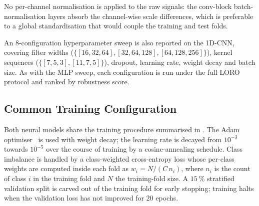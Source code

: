 \begin{table}[H]
\centering
\label{tab:cnn_arch}
\caption{1D-CNN architecture. \texttt{T} denotes the temporal length, which halves after each MaxPool stage; \texttt{C} is the number of output classes ($3$ on the farm, $5$ on the campus development dataset).}
\end{table}

No per-channel normalisation is applied to the raw signals: the conv-block batch-normalisation layers absorb the channel-wise scale differences, which is preferable to a global standardisation that would couple the training and test folds.

An $8$-configuration hyperparameter sweep is also reported on the 1D-CNN, covering filter widths ($\{[16,32,64],[32,64,128],[64,128,256]\}$), kernel sequences ($\{[7,5,3],[11,7,5]\}$), dropout, learning rate, weight decay and batch size. As with the MLP sweep, each configuration is run under the full LORO protocol and ranked by robustness score.

\subsection{Common Training Configuration}

Both neural models share the training procedure summarised in . The Adam optimiser~\cite{Kingma2014} is used with weight decay; the learning rate is decayed from $10^{-3}$ towards $10^{-5}$ over the course of training by a cosine-annealing schedule. Class imbalance is handled by a class-weighted cross-entropy loss whose per-class weights are computed inside each fold as $w_i = N / (C\,n_i)$, where $n_i$ is the count of class $i$ in the training fold and $N$ the training-fold size. A $\SI{15}{\percent}$ stratified validation split is carved out of the training fold for early stopping; training halts when the validation loss has not improved for $20$ epochs.

